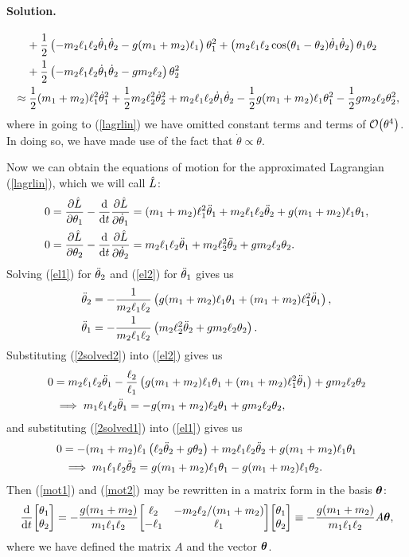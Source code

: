 \documentclass[11pt]{article}
\newcommand{\refeq}[1]{(\ref{#1})}
\newenvironment{solution}
{
    \paragraph{Solution.}
    \ignorespaces
}
{
    \bigskip
}
\begin{document}
\begin{solution}
\begin{align}
		&\phantom{\approx\ } + \frac{1}{2} \left( -m_2 \ell_1 \ell_2 \dot{\theta}_1 \dot{\theta}_2 - g (m_1 + m_2) \ell_1 \right) \theta_1^2 + \left( m_2 \ell_1 \ell_2 \cos(\theta_1 - \theta_2) \dot{\theta}_1 \dot{\theta}_2 \right) \theta_1 \theta_2 \notag \\
		&\phantom{\approx\ } + \frac{1}{2} \left( -m_2 \ell_1 \ell_2 \dot{\theta}_1 \dot{\theta}_2 - g m_2 \ell_2 \right) \theta_2^2 \\
		&\approx \frac{1}{2} (m_1 + m_2) \ell_1^2 \dot{\theta}_1^2 + \frac{1}{2} m_2 \ell_2^2 \dot{\theta}_2^2 + m_2 \ell_1 \ell_2 \dot{\theta}_1 \dot{\theta}_2 - \frac{1}{2} g (m_1 + m_2) \ell_1 \theta_1^2 - \frac{1}{2} g m_2 \ell_2 \theta_2^2, \label{lagrlin}
	\end{align}
	where in going to \refeq{lagrlin} we have omitted constant terms and terms of $\order{\theta^4}$.  In doing so, we have made use of the fact that $\dot{\theta} \propto \theta$.
	
	Now we can obtain the equations of motion for the approximated Lagrangian \refeq{lagrlin}, which we will call $\hat{L}$:
	\begin{align}
		0 &= \pdv{\hat{L}}{\theta_1} - \dv{}{t} \pdv{\hat{L}}{\dot{\theta}_1} = (m_1 + m_2) \ell_1^2 \ddot{\theta}_1 + m_2 \ell_1 \ell_2 \ddot{\theta}_2 + g (m_1 + m_2) \ell_1 \theta_1, \label{el1} \\
		0 &= \pdv{\hat{L}}{\theta_2} - \dv{}{t} \pdv{\hat{L}}{\dot{\theta}_2} = m_2 \ell_1 \ell_2 \ddot{\theta}_1 + m_2 \ell_2^2 \ddot{\theta}_2 + g m_2 \ell_2 \theta_2. \label{el2}
	\end{align}
	Solving \refeq{el1} for $\ddot{\theta}_2$ and \refeq{el2} for $\ddot{\theta}_1$ gives us
	\begin{align}
		\ddot{\theta}_2 &= -\frac{1}{m_2 \ell_1 \ell_2} \left( g (m_1 + m_2) \ell_1 \theta_1 + (m_1 + m_2) \ell_1^2 \ddot{\theta}_1 \right), \label{2solved2} \\
		\ddot{\theta}_1 &= -\frac{1}{m_2 \ell_1 \ell_2} \left( m_2 \ell_2^2 \ddot{\theta}_2 + g m_2 \ell_2 \theta_2 \right) \label{2solved1}.
	\end{align}
	Substituting \refeq{2solved2} into \refeq{el2} gives us
	\begin{align}
		0 &= m_2 \ell_1 \ell_2 \ddot{\theta}_1 - \frac{\ell_2}{\ell_1} \left( g (m_1 + m_2) \ell_1 \theta_1 + (m_1 + m_2) \ell_1^2 \ddot{\theta}_1 \right) + g m_2 \ell_2 \theta_2 \\
		&\implies m_1 \ell_1 \ell_2 \ddot{\theta}_1 = -g (m_1 + m_2) \ell_2 \theta_1 + g m_2 \ell_2 \theta_2, \label{mot1}
	\end{align}
	and substituting \refeq{2solved1} into \refeq{el1} gives us
	\begin{align}
		0 &= -(m_1 + m_2) \ell_1 \left( \ell_2 \ddot{\theta}_2 + g \theta_2 \right) + m_2 \ell_1 \ell_2 \ddot{\theta}_2 + g (m_1 + m_2) \ell_1 \theta_1 \\
		&\implies m_1 \ell_1 \ell_2 \ddot{\theta}_2 = g (m_1 + m_2) \ell_1 \theta_1 - g (m_1 + m_2) \ell_1 \theta_2. \label{mot2}
	\end{align}
	Then \refeq{mot1} and \refeq{mot2} may be rewritten in a matrix form in the basis $\boldsymbol{\theta}$:
	\begin{equation} \label{defa}
		\dv{}{t} \mqty[ \thq \\ \thw ] = -\frac{g (\mq + \mw)}{\mq \elq \elw} \mqty[ \elw & -\mw \elw / (\mq + \mw) \\ -\elq & \elq ] \mqty[ \thq \\ \thw ] \equiv -\frac{g (\mq + \mw)}{\mq \elq \elw} A \vth,
	\end{equation}
	where we have defined the matrix $A$ and the vector $\boldsymbol{\theta}$.
	

\end{solution}
\end{document}
